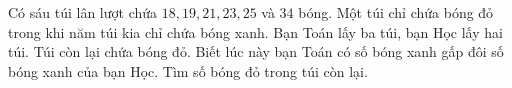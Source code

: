 \begin{bt}
   Có sáu túi lân lượt chứa $18,19,21,23,25$ và $34$ bóng. Một túi chỉ chứa bóng đỏ trong khi năm túi kia chỉ chứa bóng xanh. Bạn Toán lấy ba túi, bạn Học lấy hai túi. Túi còn lại chứa bóng đỏ. Biết lúc này bạn Toán có số bóng xanh gấp đôi số bóng xanh của bạn Học. Tìm số bóng đỏ trong túi còn lại.
\loigiai{}
\end{bt}